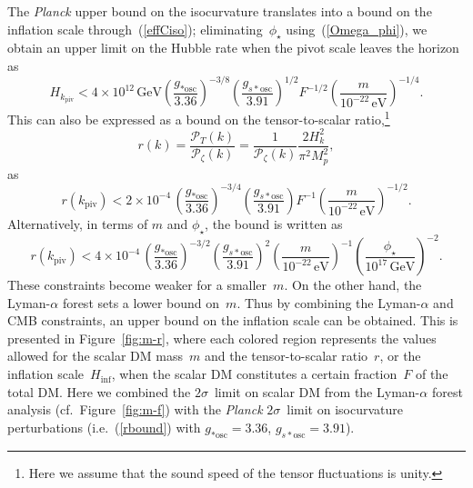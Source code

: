 \documentclass[11pt,nofootinbib]{article}
\numberwithin{equation}{section}
\begin{document}
The {\it Planck} upper bound on the isocurvature translates
into a bound on the inflation scale through~(\ref{effCiso});
eliminating~$\phi_\star$ using~(\ref{Omega_phi}),
we obtain an upper limit on the Hubble rate when the pivot scale leaves
the horizon as
\begin{equation}
 H_{k_{\mathrm{piv}}} <
  4 \times 10^{12}\, \mathrm{GeV} 
  \left(\frac{g_{*\mathrm{osc}}}{3.36}\right)^{-3/8}
  \left(\frac{g_{s*\mathrm{osc}}}{3.91}\right)^{1/2}
  F^{-1/2}
   \left( \frac{m}{10^{-22} \, \mathrm{eV}} \right)^{-1/4}.
\label{Hinfbound}
\end{equation}
This can also be expressed as a bound on the tensor-to-scalar
ratio,\footnote{Here we assume that the sound speed of the tensor
fluctuations is unity.}
\begin{equation}
 r(k) = \frac{\mathcal{P}_T (k)}{\mathcal{P}_\zeta (k)}
  = \frac{1}{\mathcal{P}_{\zeta } (k)}\frac{2 H_k^2}{\pi^2 M_p^2},
\label{ts-ratio}
\end{equation}
as
\begin{equation}
 r (k_{\mathrm{piv}}) <
  2 \times 10^{-4} \, 
  \left(\frac{g_{*\mathrm{osc}}}{3.36}\right)^{-3/4}
  \left(\frac{g_{s*\mathrm{osc}}}{3.91}\right)
  F^{-1}
   \left( \frac{m}{10^{-22} \, \mathrm{eV}} \right)^{-1/2}.
\label{rbound}
\end{equation}
Alternatively, in terms of $m$ and $\phi_\star$, the bound is written as
\begin{equation}
 r (k_{\mathrm{piv}}) <
  4 \times 10^{-4} \, 
  \left(\frac{g_{*\mathrm{osc}}}{3.36}\right)^{-3/2}
  \left(\frac{g_{s*\mathrm{osc}}}{3.91}\right)^2
  \left( \frac{m}{10^{-22} \, \mathrm{eV}} \right)^{-1}
  \left( \frac{\phi_\star}{10^{17} \, \mathrm{GeV}} \right)^{-2}.
\label{rbound2}
\end{equation}
%
These constraints become weaker for a smaller~$m$.
On the other hand, the Lyman-$\alpha$ forest sets a lower bound on~$m$.
Thus by combining the Lyman-$\alpha$ and CMB constraints, an upper bound
on the inflation scale can be obtained.
%
This is presented in Figure~\ref{fig:m-r}, where
each colored region represents the values allowed for the scalar DM
mass~$m$ and the tensor-to-scalar ratio~$r$, or the inflation
scale~$H_{\mathrm{inf}}$,
when the scalar DM constitutes a certain fraction~$F$ of the total DM.
Here we combined the $2\sigma$~limit on scalar DM from the
Lyman-$\alpha$ forest analysis (cf.~Figure~\ref{fig:m-f}) with the
{\it Planck} $2\sigma$~limit on isocurvature perturbations
(i.e.~(\ref{rbound}) with 
$g_{*\mathrm{osc}} = 3.36$, $g_{s*\mathrm{osc}} = 3.91$).
\end{document}
